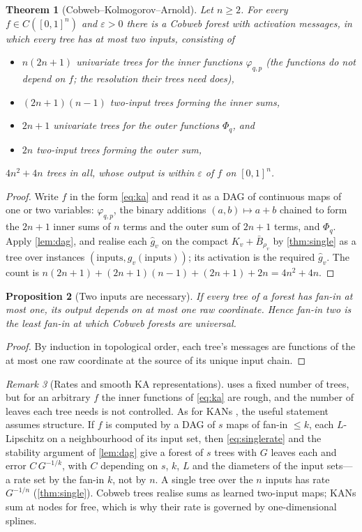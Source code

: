 \documentclass[11pt]{article}
\newtheorem{theorem}{Theorem}
\newtheorem{proposition}[theorem]{Proposition}
\theoremstyle{definition}
\theoremstyle{remark}
\newtheorem{remark}[theorem]{Remark}
\begin{document}
\begin{theorem}[Cobweb--Kolmogorov--Arnold]\label{thm:cka}
Let $n\ge2$.  For every $f\in C([0,1]^n)$ and $\varepsilon>0$ there is a Cobweb forest
with activation messages, in which every tree has at most two inputs, consisting of
\begin{itemize}[leftmargin=*,noitemsep]
\item $n(2n+1)$ univariate trees for the inner functions $\varphi_{q,p}$ (the functions do
  not depend on $f$; the resolution their trees need does),
\item $(2n+1)(n-1)$ two-input trees forming the inner sums,
\item $2n+1$ univariate trees for the outer functions $\Phi_q$, and
\item $2n$ two-input trees forming the outer sum,
\end{itemize}
$4n^2+4n$ trees in all, whose output is within $\varepsilon$ of $f$ on $[0,1]^n$.
\end{theorem}
\begin{proof}
Write $f$ in the form \eqref{eq:ka} and read it as a DAG of continuous maps of one or
two variables: $\varphi_{q,p}$, the binary additions $(a,b)\mapsto a+b$ chained to form
the $2n+1$ inner sums of $n$ terms and the outer sum of $2n+1$ terms, and $\Phi_q$.
Apply \cref{lem:dag}, and realise each $\hat g_v$ on the compact
$K_v+\bar B_{\rho_v}$ by \cref{thm:single} as a tree over instances
$(\text{inputs},g_v(\text{inputs}))$; its activation is the required $\hat g_v$.  The
count is $n(2n+1)+(2n+1)(n-1)+(2n+1)+2n=4n^2+4n$.
\end{proof}

\begin{proposition}[Two inputs are necessary]\label{prop:fanin}
If every tree of a forest has fan-in at most one, its output depends on at most one raw
coordinate.  Hence fan-in two is the least fan-in at which Cobweb forests are universal.
\end{proposition}
\begin{proof}
By induction in topological order, each tree's messages are functions of the at most one
raw coordinate at the source of its unique input chain.
\end{proof}

\begin{remark}[Rates and smooth KA representations]\label{rem:rates}
 uses a fixed number of trees, but for an arbitrary $f$ the inner functions
of \eqref{eq:ka} are rough, and the number of leaves each tree needs is not controlled.
As for KANs \citep[Thm.~2.1]{liu2024kan}, the useful statement assumes structure.  If
$f$ is computed by a DAG of $s$ maps of fan-in $\le k$, each $L$-Lipschitz on a
neighbourhood of its input set, then \eqref{eq:singlerate} and the stability argument of
\cref{lem:dag} give a forest of $s$ trees with $G$ leaves each and error $C\,G^{-1/k}$, with $C$
depending on $s$, $k$, $L$ and the diameters of the input sets---a rate set by the fan-in
$k$, not by $n$.  A single
tree over the $n$ inputs has rate $G^{-1/n}$ (\cref{thm:single}).  Cobweb trees realise
sums as learned two-input maps; KANs sum at nodes for free, which is why their rate is
governed by one-dimensional splines.
\end{remark}
\end{document}
